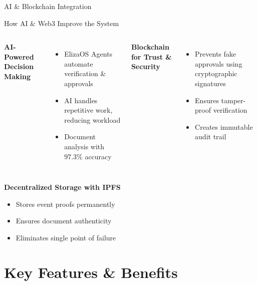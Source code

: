 \documentclass{beamer}
\begin{document}
\begin{frame}{AI \& Blockchain Integration}
\begin{block}{How AI \& Web3 Improve the System}
\end{block}

\begin{columns}
\textbf{AI-Powered Decision Making}
\begin{itemize}
    \item ElizaOS Agents automate verification \& approvals
    \item AI handles repetitive work, reducing workload
    \item Document analysis with 97.3\% accuracy
\end{itemize}

\textbf{Blockchain for Trust \& Security}
\begin{itemize}
    \item Prevents fake approvals using cryptographic signatures
    \item Ensures tamper-proof verification
    \item Creates immutable audit trail
\end{itemize}
\end{columns}

\vspace{0.5cm}
\textbf{Decentralized Storage with IPFS}
\begin{itemize}
    \item Stores event proofs permanently
    \item Ensures document authenticity
    \item Eliminates single point of failure
\end{itemize}
\end{frame}

\section{Key Features \& Benefits}
\end{document}
